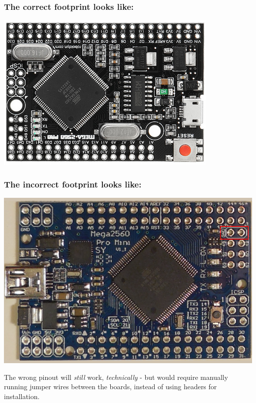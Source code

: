 \documentclass[11pt]{article}
\begin{document}
\subsubsection{The \textbf{correct} footprint looks like:}
\label{sec:org90f96c3}
\begin{center}
\includegraphics[width=.9\linewidth]{../png/2.1/Correct2560.png}
\end{center}

\subsubsection{The \textbf{incorrect} footprint looks like:}
\label{sec:orgf11619f}
\begin{center}
\includegraphics[width=.9\linewidth]{../png/2.1/Wrong2560.png}
\end{center}

The wrong pinout will \emph{still} work, \emph{technically} - but would require manually running jumper wires between the boards, instead of using headers for installation.
\end{document}
